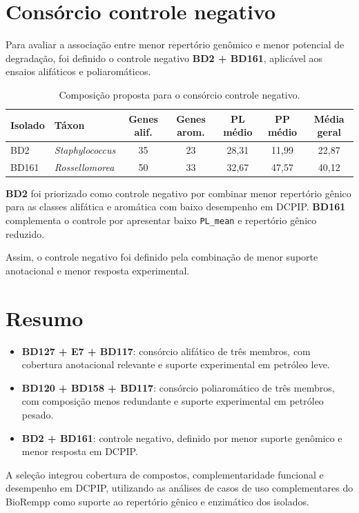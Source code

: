 \documentclass[12pt,a4paper]{article}
\begin{document}
\section{Consórcio controle negativo}

Para avaliar a associação entre menor repertório genômico e menor potencial de degradação, foi definido o controle negativo \textbf{BD2 + BD161}, aplicável aos ensaios alifáticos e poliaromáticos.

\begin{table}[H]
\centering
\small
\caption{Composição proposta para o consórcio controle negativo.}
\begin{tabular}{llccccc}
\toprule
\textbf{Isolado} & \textbf{Táxon} & \textbf{Genes alif.} & \textbf{Genes arom.} & \textbf{PL médio} & \textbf{PP médio} & \textbf{Média geral} \\
\midrule
BD2 & \textit{Staphylococcus} & 35 & 23 & 28,31 & 11,99 & 22,87 \\
BD161 & \textit{Rossellomorea} & 50 & 33 & 32,67 & 47,57 & 40,12 \\
\bottomrule
\end{tabular}
\normalsize
\end{table}

\textbf{BD2} foi priorizado como controle negativo por combinar menor repertório gênico para as classes alifática e aromática com baixo desempenho em DCPIP. \textbf{BD161} complementa o controle por apresentar baixo \texttt{PL\_mean} e repertório gênico reduzido.

Assim, o controle negativo foi definido pela combinação de menor suporte anotacional e menor resposta experimental.

\section{Resumo}


\begin{itemize}
    \item \textbf{BD127 + E7 + BD117}: consórcio alifático de três membros, com cobertura anotacional relevante e suporte experimental em petróleo leve.
    \item \textbf{BD120 + BD158 + BD117}: consórcio poliaromático de três membros, com composição menos redundante e suporte experimental em petróleo pesado.
    \item \textbf{BD2 + BD161}: controle negativo, definido por menor suporte genômico e menor resposta em DCPIP.
\end{itemize}

A seleção integrou cobertura de compostos, complementaridade funcional e desempenho em DCPIP, utilizando as análises de casos de uso complementares do BioRempp como suporte ao repertório gênico e enzimático dos isolados.
\end{document}

